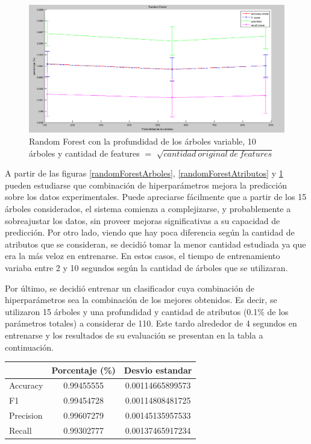 \documentclass{article}
\begin{document}
\begin{figure}[H] %
\begin{center}
\includegraphics[width=500pt]{randomForestScoreProfundidad.png}
\caption{Random Forest con la profundidad de los árboles variable, 10 árboles y cantidad de features $=$ $\sqrt{cantidad\ original\ de\ features}$}
\label{randomForestProfundidad}
\end{center}
\end{figure}

A partir de las figuras \ref{randomForestArboles}, \ref{randomForestAtributos} y \ref{randomForestProfundidad} pueden estudiarse que combinación de hiperparámetros mejora la predicción sobre los datos experimentales. Puede apreciarse fácilmente que a partir de los 15 árboles considerados, el sistema comienza a complejizarse, y probablemente a sobreajustar los datos, sin proveer mejoras significativas a su capacidad de predicción. Por otro lado, viendo que hay poca diferencia según la cantidad de atributos que se consideran, se decidió tomar la menor cantidad estudiada ya que era la más veloz en entrenarse. En estos casos, el tiempo de entrenamiento variaba entre 2 y 10 segundos según la cantidad de árboles que se utilizaran.

Por último, se decidió entrenar un clasificador cuya combinación de hiperparámetros sea la combinación de los mejores obtenidos. Es decir, se utilizaron 15 árboles y una profundidad y cantidad de atributos (0.1\% de los parámetros totales) a considerar de 110. Este tardo alrededor de 4 segundos en entrenarse y los resultados de su evaluación se presentan en la tabla a continuación.

\begin{center}
  \begin{tabular}{| l | c | c |}
    \hline
      & Porcentaje (\%) & Desvio estandar  \\ \hline
    Accuracy & 0.99455555 & 0.00114665899573 \\ \hline
    F1 & 0.99454728 & 0.00114808481725 \\ \hline
    Precision & 0.99607279 & 0.00145135957533 \\ \hline
    Recall & 0.99302777 & 0.00137465917234 \\
    \hline
  \end{tabular}
\end{center}
\end{document}
